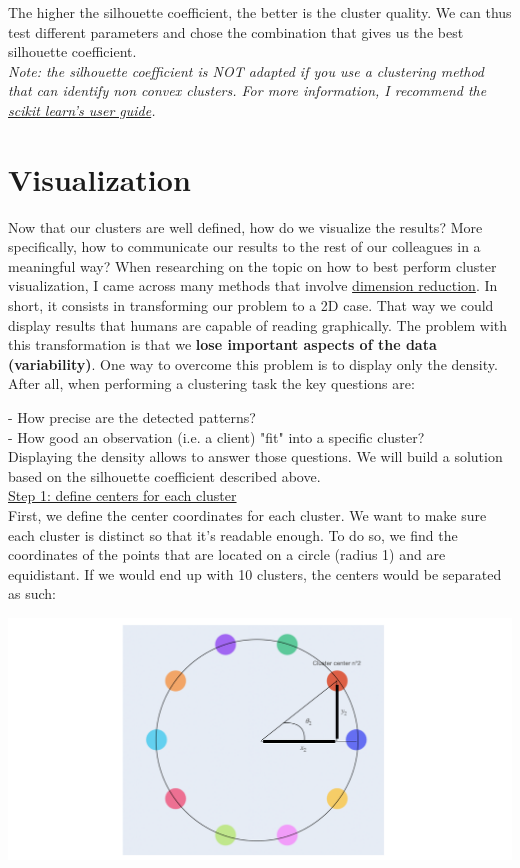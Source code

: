The higher the silhouette coefficient, the better is the cluster quality. We can thus test different parameters and chose the combination that gives us the best silhouette coefficient. \\

\textit{Note: the silhouette coefficient is NOT adapted if you use a clustering method that can identify non convex clusters. For more information, I recommend the \href{https://scikit-learn.org/stable/modules/clustering.html}{scikit learn's user guide}.}


\section{Visualization}

Now that our clusters are well defined, how do we visualize the results? More specifically, how to communicate our results to the rest of our colleagues in a meaningful way?
When researching on the topic on how to best perform cluster visualization, I came across many methods that involve \href{https://en.wikipedia.org/wiki/Dimensionality_reduction}{dimension reduction}. In short, it consists in transforming our problem to a 2D case. That way we could display results that humans are capable of reading graphically. The problem with this transformation is that we \textbf{lose important aspects of the data (variability)}.
One way to overcome this problem is to display only the density. After all, when performing a clustering task the key questions are:

- How precise are the detected patterns? \\
- How good an observation (i.e. a client) "fit" into a specific cluster? \\

Displaying the density allows to answer those questions. We will build a solution based on the silhouette coefficient described above. \\

\underline{Step 1: define centers for each cluster} \\

First, we define the center coordinates for each cluster. We want to make sure each cluster is distinct so that it's readable enough. To do so, we find the coordinates of the points that are located on a circle (radius 1) and are equidistant. If we would end up with 10 clusters, the centers would be separated as such:

\begin{center}
\includegraphics[scale=0.5]{./../img/10-clusters-angle-3}
\end{center}

